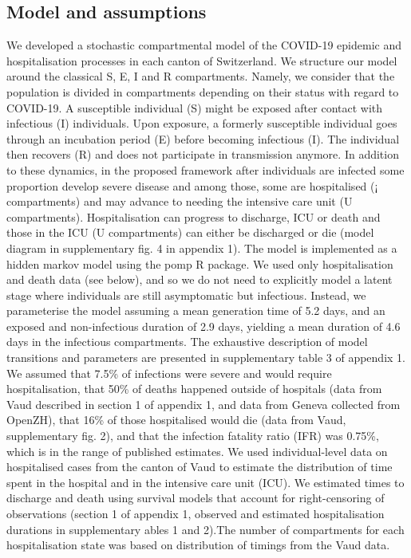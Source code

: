 \subsection{Model and assumptions}
We developed a stochastic compartmental model of the COVID-19 epidemic and hospitalisation processes in each canton of Switzerland. We structure our model around the classical S, E, I and R compartments\cite{Kermack:ContributionMathematicalTheory:1927}. Namely, we consider that the population is divided in compartments depending on their status with regard to COVID-19. A susceptible individual (S) might be exposed after contact with infectious (I) individuals. Upon exposure, a formerly susceptible individual goes through an incubation period (E) before becoming infectious (I). The individual then recovers (R) and does not participate in transmission anymore. In addition to these dynamics, in the proposed framework after individuals are infected some proportion develop severe disease and among those, some are hospitalised (¡ compartments) and may advance to needing the intensive care unit (U compartments). Hospitalisation can progress to discharge, ICU or death and those in the ICU (U compartments) can either be discharged or die (model diagram in supplementary fig. 4 in appendix 1). The model is implemented as a hidden markov model using the pomp R package\cite{King:StatisticalInferencePartially:2015}. 
We used only hospitalisation and death data (see below), and so we do not need to explicitly model a latent stage where individuals are still asymptomatic but infectious\cite{Ganyani:EstimatingGenerationInterval:2020,He:TemporalDynamicsViral:2020, Liu:ContributionPresymptomaticInfection:2020}. Instead, we parameterise the model assuming a mean generation time of 5.2 days\cite{Ganyani:EstimatingGenerationInterval:2020}, and an exposed and non-infectious duration of 2.9 days\cite{He:TemporalDynamicsViral:2020}, yielding a mean duration of 4.6 days in the infectious compartments. The exhaustive description of model transitions and parameters are presented in supplementary table 3 of appendix 1. We assumed that 7.5\% of infections were severe and would require hospitalisation, that 50\% of deaths happened outside of hospitals (data from Vaud described in section 1 of appendix 1, and data from Geneva collected from OpenZH), that 16\% of those hospitalised would die (data from Vaud, supplementary fig. 2), and that the infection fatality ratio (IFR) was 0.75\%, which is in the range of published estimates\cite{Verity:EstimatesSeverityCoronavirus:2020, Russell:EstimatingInfectionCase:2020}. We used individual-level data on hospitalised cases from the canton of Vaud to estimate the distribution of time spent in the hospital and in the intensive care unit (ICU). We estimated times to discharge and death using survival models that account for right-censoring of observations (section 1 of appendix 1, observed and estimated hospitalisation durations in supplementary ables 1 and 2).The number of compartments for each hospitalisation state was based on distribution of timings from the Vaud data. 
